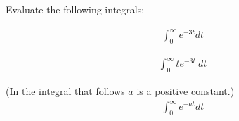 

\begin{problem}
\item Evaluate the following integrals:

  \begin{subproblem}
  \item 
    \begin{eqnarray}
      \int^\infty_0 e^{-3t} dt 
    \end{eqnarray}
    \vfill

  \item 
    \begin{eqnarray}
      \int^\infty_0 t e^{-3t} ~ dt
    \end{eqnarray}
    \vfill
    
  \item (In the  integral that follows $a$ is a positive constant.)
    \begin{eqnarray}
      \int^\infty_0 e^{-at} dt 
    \end{eqnarray}
    \vfill

  \end{subproblem}
\end{problem}

